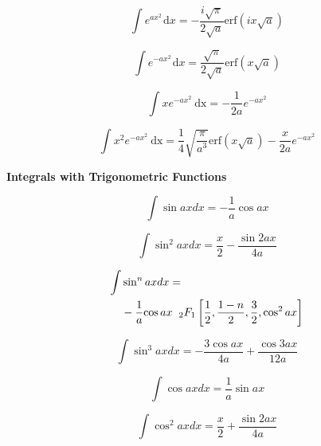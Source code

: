 \documentclass[11pt,twoside]{article}
\begin{document}
\begin{multicols}{3}
\begin{footnotesize}
\begin{equation}
\int e^{ax^2}\hspace{1pt}\text{d}x = -\frac{i\sqrt{\pi}}{2\sqrt{a}}\text{erf}\left(ix\sqrt{a}\right) 
\end{equation}

\begin{equation}
\int e^{-ax^2}\hspace{1pt}\text{d}x = \frac{\sqrt{\pi}}{2\sqrt{a}}\text{erf}\left(x\sqrt{a}\right) 
\end{equation}

\begin{equation}
\int x e^{-ax^2}\ \text{dx} = -\dfrac{1}{2a}e^{-ax^2} 
\end{equation}

\begin{equation}
\int x^2 e^{-ax^2}\ \text{dx} = \dfrac{1}{4}\sqrt{\dfrac{\pi}{a^3}}\text{erf}(x\sqrt{a}) -\dfrac{x}{2a}e^{-ax^2}
\end{equation}

\columnbreak
\begin{center} \textbf {Integrals with Trigonometric Functions} \end{center}

\begin{equation}
\int \sin ax dx = -\frac{1}{a} \cos ax 
\end{equation}

\begin{equation}
\int \sin^2 ax dx = \frac{x}{2} - \frac{\sin 2ax} {4a} 
\end{equation}

\begin{align}
\int &\sin^n ax dx =
\nonumber \\ &
 -\frac{1}{a}{\cos ax} \hspace{2mm}{_2F_1}\left[
\frac{1}{2}, \frac{1-n}{2}, \frac{3}{2}, \cos^2 ax
\right] 
\end{align}

\begin{equation}
\int \sin^3 ax dx = -\frac{3 \cos ax}{4a} + \frac{\cos 3ax} {12a} 
\end{equation}

\begin{equation}
\int \cos ax dx= \frac{1}{a} \sin ax 
\end{equation}

\begin{equation}
\int \cos^2 ax dx = \frac{x}{2}+\frac{ \sin 2ax}{4a} 
\end{equation}


\end{footnotesize}
\end{multicols}
\end{document}
